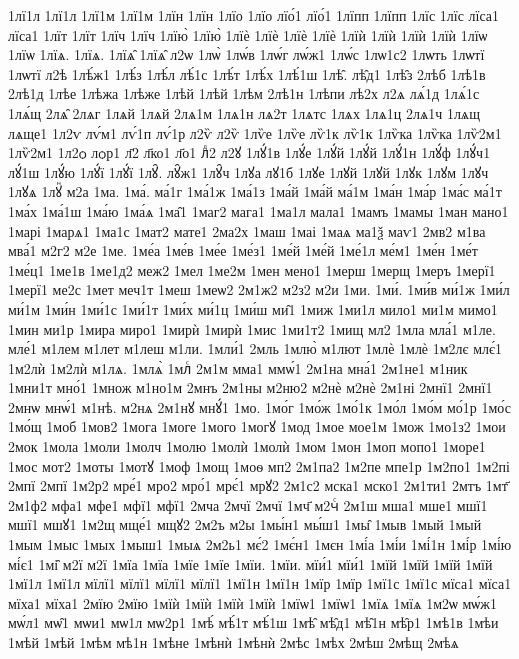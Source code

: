 {1лї1л
1лї1л
1лї1м
1лї1м
1лїн
1лїн
1лїо
1лїо
лїо́1
лїо́1
1лїпп
1лїпп
1лїс
1лїс
лїса1
лїса1
1лїт
1лїт
1лїч
1лїч
1лїю̀
1лїю̀
1лїѐ
1лїѐ
1лїѐ
1лїѐ
1лїѝ
1лїѝ
1лїѝ
1лїѝ
1лїѡ
1лїѡ
1лїѧ.
1лїѧ.
1лїѧ̑
1лїѧ̑
л2ѡ
1лѡ̀
1лѡ́в
1лѡ́г
лѡ́ж1
1лѡ́с
1лѡ1с2
1лѡть
1лѡтї
1лѡтї
л2ѣ
1лѣ́ж1
1лѣ́з
1лѣ́л
лѣ́1с
1лѣ́т
1лѣ́х
1лѣ́1ш
1лѣ̑.
лѣ̑д1
1лѣ̑з
2лѣб
1лѣ1в
2лѣ1д
1лѣе
1лѣжа
1лѣже
1лѣй
1лѣй
1лѣм
2лѣ1н
1лѣпи
лѣ2х
л2ѧ
лѧ́1д
1лѧ́1с
1лѧ́щ
2лѧ̑
2лѧг
1лѧй
1лѧй
2лѧ1м
1лѧ1н
лѧ2т
1лѧтс
1лѧх
1лѧ1ц
2лѧ1ч
1лѧщ
лѧще1
1л2ѵ
лѵ́м1
лѵ́1п
лѵ́1р
л2ѷ
л2ѷ
1лѷе
1лѷе
лѷ1к
лѷ1к
1лѷка
1лѷка
1лѷ2м1
1лѷ2м1
1л2ѻ
лѻр1
л҃2
л҃ко1
л҃о1
лⷣ2
л2ꙋ
1лꙋ́1в
1лꙋ́е
1лꙋ́й
1лꙋ́й
1лꙋ́1н
1лꙋ́ф
1лꙋ́ч1
лꙋ́1ш
1лꙋ́ю
1лꙋ́ї
1лꙋ́ї
1лꙋ̑.
лꙋ̑ж1
1лꙋ̑ч
1лꙋа
лꙋ1б
1лꙋе
1лꙋй
1лꙋй
1лꙋк
1лꙋм
1лꙋч
1лꙋѧ
1лꙋⷩ
м2а
1ма.
1ма́.
ма́1г
1ма́1ж
1ма́1з
1ма́й
1ма́й
ма́1м
1ма́н
1ма́р
1ма́с
ма́1т
1ма́х
1ма́1ш
1ма́ю
1ма́ѧ
1ма̑1
1маг2
мага1
1ма1л
мала1
1мамъ
1мамы
1ман
мано1
1марі
1марѧ1
1ма1с
1мат2
мате1
2ма2х
1маш
1маі
1маѧ
ма1ѯ
маѵ1
2мв2
м1ва
мва́1
м2г2
м2е
1ме.
1ме́а
1ме́в
1ме́е
1ме́з1
1ме́й
1ме́й
1ме́1л
ме́м1
1ме́н
1ме́т
1ме́ц1
1ме1в
1ме1д2
меж2
1мел
1ме2м
1мен
мено1
1мерш
1мерщ
1меръ
1мерї1
1мерї1
ме2с
1мет
меч1т
1меш
1меѡ2
2м1ж2
м2з2
м2и
1ми.
1ми́.
1ми́в
ми́1ж
1ми́л
ми́1м
1ми́н
1ми́1с
1ми́1т
1ми́х
ми́1ц
1ми́ш
ми̑1
1миж
1ми1л
мило1
ми1м
мимо1
1мин
ми1р
1мира
миро1
1мирѝ
1мирѝ
1мис
1ми1т2
1мищ
мл2
1мла
мла́1
м1ле.
мле́1
м1лем
м1лет
м1леш
м1ли.
1мли́1
2мль
1млю̀
м1лют
1млѐ
1млѐ
1м2лє
млє́1
1м2лѝ
1м2лѝ
м1лѧ.
1млѧ̀
1млⷭ
2м1м
мма1
ммѡ́1
2м1на
мна́1
2м1не1
м1ник
1мни1т
мно́1
1множ
м1но1м
2мнъ
2м1ны
м2ню2
м2нѐ
м2нѐ
2м1ні
2мнї1
2мнї1
2мнѡ
мнѡ́1
м1нѣ.
м2нѧ
2м1нꙋ
мнꙋ́1
1мо.
1мо́г
1мо́ж
1мо́1к
1мо́л
1мо́м
мо́1р
1мо́с
1мо́щ
1моб
1мов2
1мога
1моге
1мого
1могꙋ
1мод
1мое
мое1м
1мож
1мо1з2
1мои
2мок
1мола
1моли
1молч
1молю
1молѝ
1молѝ
1мом
1мон
1моп
мопо1
1море1
1мос
мот2
1моты
1мотꙋ
1моф
1мощ
1моѳ
мп2
2м1па2
1м2пе
мпе1р
1м2по1
1м2пі
2мпї
2мпї
1м2р2
мре́1
мро2
мро́1
мрє́1
мрꙋ2
2м1с2
мска1
мско1
2м1ти1
2мтъ
1мт҃
2м1ф2
мфа1
мфе1
мфї1
мфї1
2мча
2мчї
2мчї
1мч҃
м2чⷭ
2м1ш
мша1
мше1
мшї1
мшї1
мшꙋ1
1м2щ
мще́1
мщꙋ2
2м2ъ
м2ы
1мы́н1
мы́ш1
1мы̑
1мыв
1мый
1мый
1мым
1мыс
1мых
1мыш1
1мыѧ
2м2ь1
мє́2
1мє́н1
1мєн
1мі́а
1мі́и
1мі́1н
1мі́р
1мі́ю
мі́є1
1мі̑
м2ї
м2ї
1мїа
1мїа
1мїе
1мїе
1мїи.
1мїи.
мїи́1
мїи́1
1мїй
1мїй
1мїй
1мїй
1мї1л
1мї1л
мїлї1
мїлї1
мїлї1
мїлї1
1мї1н
1мї1н
1мїр
1мїр
1мї1с
1мї1с
мїса1
мїса1
мїха1
мїха1
2мїю
2мїю
1мїѝ
1мїѝ
1мїѝ
1мїѝ
1мїѡ1
1мїѡ1
1мїѧ
1мїѧ
1м2ѡ
мѡ́ж1
мѡ́л1
мѡ̑1
мѡи1
мѡ1л
мѡ2р1
1мѣ́
мѣ́1т
мѣ́1ш
1мѣ̑
мѣ̑д1
мѣ̑1н
мѣ̑р1
1мѣ1в
1мѣи
1мѣй
1мѣй
1мѣм
мѣ1н
1мѣне
1мѣнѝ
1мѣнѝ
2мѣс
1мѣх
2мѣш
2мѣщ
2мѣѧ
}
